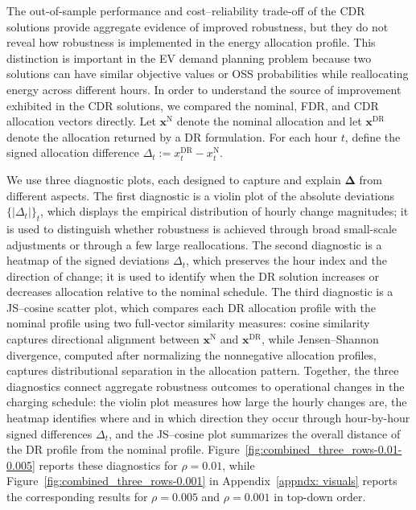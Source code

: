 \documentclass[opre,sglanonrev]{informs4}
\newcommand{\bx}{\bm{x}}
\begin{document}
{The out-of-sample performance and cost--reliability trade-off of the CDR solutions provide aggregate evidence of improved robustness, but they do not reveal how robustness is implemented in the energy allocation profile. This distinction is important in the EV demand planning problem because two solutions can have similar objective values or OSS probabilities while reallocating energy across different hours. In order to understand the source of improvement exhibited in the CDR solutions, we compared the nominal, FDR, and CDR allocation vectors directly. Let \(\bx^{\mathrm N}\) denote the nominal allocation and let \(\bx^{\mathrm{DR}}\) denote the allocation returned by a DR formulation. For each hour \(t\), define the signed allocation difference $\Delta_t:=x_t^{\mathrm{DR}}-x_t^{\mathrm N}.$


We use three diagnostic plots, each designed to capture and explain \(\boldsymbol \Delta\) from different aspects. The first diagnostic is a violin plot of the absolute deviations \(\{|\Delta_t|\}_t\), which displays the empirical distribution of hourly change magnitudes; it is used to distinguish whether robustness is achieved through broad small-scale adjustments or through a few large reallocations. The second diagnostic is a heatmap of the signed deviations \(\Delta_t\), which preserves the hour index and the direction of change; it is used to identify when the DR solution increases or decreases allocation relative to the nominal schedule. The third diagnostic is a JS--cosine scatter plot, which compares each DR allocation profile with the nominal profile using two full-vector similarity measures: cosine similarity captures directional alignment between \(\bx^{\mathrm N}\) and \(\bx^{\mathrm{DR}}\), while Jensen--Shannon divergence, computed after normalizing the nonnegative allocation profiles, captures distributional separation in the allocation pattern. Together, the three diagnostics connect aggregate robustness outcomes to operational changes in the charging schedule: the violin plot measures how large the hourly changes are, the heatmap identifies where and in which direction they occur through hour-by-hour signed differences \(\Delta_t\), and the JS--cosine plot summarizes the overall distance of the DR profile from the nominal profile. Figure~\ref{fig:combined_three_rows-0.01-0.005} reports these diagnostics for \(\rho=0.01\), while Figure~\ref{fig:combined_three_rows-0.001} in Appendix~\ref{appndx: visuals} reports the corresponding results for \(\rho=0.005\) and \(\rho=0.001\) in top-down order.

}
\end{document}
